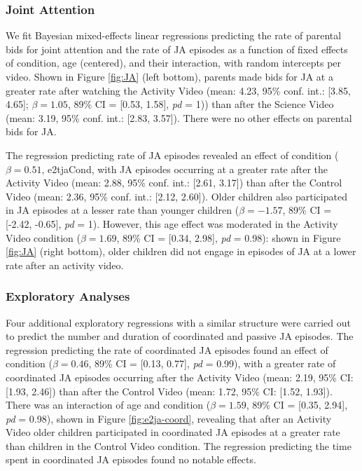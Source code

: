 \documentclass[man,floatsintext]{apa6}
\begin{document}
\hypertarget{joint-attention-1}{%
\subsubsection{Joint Attention}\label{joint-attention-1}}

We fit Bayesian mixed-effects linear regressions predicting the rate of parental bids for joint attention and the rate of JA episodes as a function of fixed effects of condition, age (centered), and their interaction, with random intercepts per video.
Shown in Figure \ref{fig:JA} (left bottom), parents made bids for JA at a greater rate after watching the Activity Video (mean: 4.23, 95\% conf. int.: {[}3.85, 4.65{]}; \(\beta=1.05\), 89\% CI = {[}0.53, 1.58{]}, \emph{pd} = 1)) than after the Science Video (mean: 3.19, 95\% conf. int.: {[}2.83, 3.57{]}).
There were no other effects on parental bids for JA.

The regression predicting rate of JA episodes revealed an effect of condition (\(\beta=0.51\), e2tjaCond, with JA episodes occurring at a greater rate after the Activity Video (mean: 2.88, 95\% conf. int.: {[}2.61, 3.17{]}) than after the Control Video (mean: 2.36, 95\% conf. int.: {[}2.12, 2.60{]}).
Older children also participated in JA episodes at a lesser rate than younger children (\(\beta=-1.57\), 89\% CI = {[}-2.42, -0.65{]}, \emph{pd} = 1).
However, this age effect was moderated in the Activity Video condition (\(\beta=1.69\), 89\% CI = {[}0.34, 2.98{]}, \emph{pd} = 0.98): shown in Figure \ref{fig:JA} (right bottom), older children did not engage in episodes of JA at a lower rate after an activity video.

\hypertarget{exploratory-analyses-1}{%
\subsubsection{Exploratory Analyses}\label{exploratory-analyses-1}}

Four additional exploratory regressions with a similar structure were carried out to predict the number and duration of coordinated and passive JA episodes.
The regression predicting the rate of coordinated JA episodes found an effect of condition (\(\beta=0.46\), 89\% CI = {[}0.13, 0.77{]}, \emph{pd} = 0.99), with a greater rate of coordinated JA episodes occurring after the Activity Video (mean: 2.19, 95\% CI: {[}1.93, 2.46{]}) than after the Control Video (mean: 1.72, 95\% CI: {[}1.52, 1.93{]}).
There was an interaction of age and condition (\(\beta=1.59\), 89\% CI = {[}0.35, 2.94{]}, \emph{pd} = 0.98), shown in Figure \ref{fig:e2ja-coord}, revealing that after an Activity Video older children participated in coordinated JA episodes at a greater rate than children in the Control Video condition.
The regression predicting the time spent in coordinated JA episodes found no notable effects.
\end{document}
